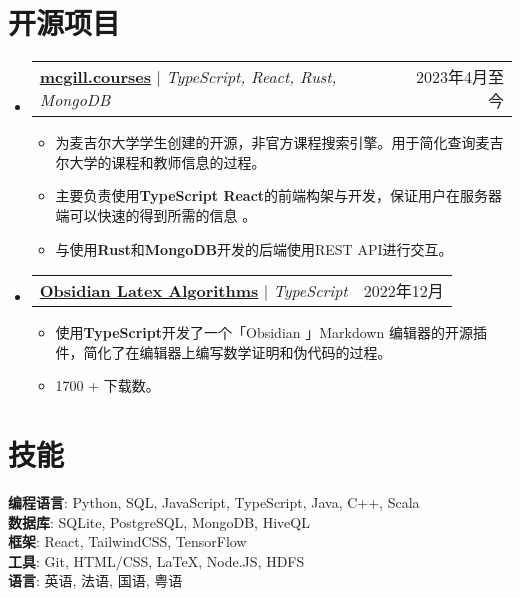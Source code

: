\documentclass[letterpaper,11pt]{article}
\makeatletter
\newcommand{\resumeItem}[1]{
  \item\small{
    {#1 \vspace{-2pt}}
  }
}
\newcommand{\resumeProjectHeading}[2]{
  \item
  \begin{tabular*}{0.97\textwidth}{l@{\extracolsep{\fill}}r}
    \small#1 & #2 \\
  \end{tabular*}\vspace{-7pt}
}
\newcommand{\resumeSubHeadingListStart}{\begin{itemize}[leftmargin=0.15in, label={}]}
\newcommand{\resumeSubHeadingListEnd}{\end{itemize}}
\newcommand{\resumeItemListStart}{\begin{itemize}}
\newcommand{\resumeItemListEnd}{\end{itemize}\vspace{-5pt}}
\makeatother
\begin{document}
\begin{CJK*}{UTF8}{gbsn}
  \section{开源项目}
  \resumeSubHeadingListStart
  \resumeProjectHeading
  {\href{https://mcgill.courses}{\textbf{mcgill.courses}} $|$ \emph{TypeScript, React, Rust, MongoDB}}{2023年4月至今}
  \resumeItemListStart
  \resumeItem{为麦吉尔大学学生创建的开源，非官方课程搜索引擎。用于简化查询麦吉尔大学的课程和教师信息的过程。}
  \resumeItem{主要负责使用\textbf{TypeScript React}的前端构架与开发，保证用户在服务器端可以快速的得到所需的信息 。}
  \resumeItem{与使用\textbf{Rust}和\textbf{MongoDB}开发的后端使用REST API进行交互。}
  \resumeItemListEnd
  \resumeProjectHeading
  {\href{https://github.com/SamZhang02/obsidian-latex-algorithms}{\textbf{Obsidian Latex Algorithms}} $|$ \emph{TypeScript}}{2022年12月}
  \resumeItemListStart
  \resumeItem{使用\textbf{TypeScript}开发了一个「Obsidian 」Markdown 编辑器的开源插件，简化了在编辑器上编写数学证明和伪代码的过程。}
  \resumeItem{1700 + 下载数。}
  \resumeItemListEnd
  \resumeSubHeadingListEnd

  \section{技能}
  \begin{itemize}[leftmargin=0.15in, label={}]
    \small{\item{
          \textbf{编程语言}{: Python, SQL, JavaScript, TypeScript, Java, C++, Scala} \\
          \textbf{数据库}{: SQLite, PostgreSQL, MongoDB, HiveQL}\\
          \textbf{框架}{: React, TailwindCSS, TensorFlow}\\
          \textbf{工具}{: Git, HTML/CSS, \LaTeX, Node.JS, HDFS}\\
          \textbf{语言}{: 英语, 法语, 国语, 粤语}\\
          }}
  \end{itemize}

\end{CJK*}
\end{document}

